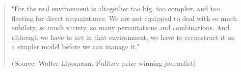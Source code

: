 






\begin{quote}
"For the real environment is altogether too big, too complex, and too fleeting for direct acquaintance. We are not equipped to deal with so much subtlety, so much variety, so many permutations and combinations. And although we have to act in that environment, we have to reconstruct it on a simpler model before we can manage it." 
\medskip

\noindent (Source: Walter Lippmann, Pulitzer prize-winning journalist)
\end{quote}

